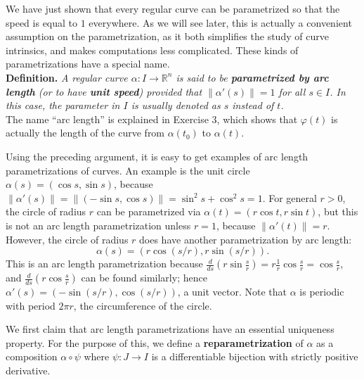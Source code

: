 \documentclass[leqno]{book}
\begin{document}
We have just shown that every regular curve can be parametrized so that the speed is equal to $1$ everywhere.  As we will see later, this is actually a convenient assumption on the parametrization, as it both simplifies the study of curve intrinsics, and makes computations less complicated.  These kinds of parametrizations have a special name.\\

\noindent\textbf{Definition.} \emph{A regular curve $\alpha:I\to\mathbb R^n$ is said to be \textbf{parametrized by arc length} (or to have \textbf{unit speed}) provided that $\|\alpha'(s)\|=1$ for all $s\in I$.  In this case, the parameter in $I$ is usually denoted as $s$ instead of $t$.}\\

\noindent The name ``arc length'' is explained in Exercise 3, which shows that $\varphi(t)$ is actually the length of the curve from $\alpha(t_0)$ to $\alpha(t)$.

Using the preceding argument, it is easy to get examples of arc length parametrizations of curves.  An example is the unit circle $\alpha(s)=(\cos s,\sin s)$, because $\|\alpha'(s)\|=\|(-\sin s,\cos s)\|=\sin^2s+\cos^2s=1$.  For general $r>0$, the circle of radius $r$ can be parametrized via $\alpha(t)=(r\cos t,r\sin t)$, but this is not an arc length parametrization unless $r=1$, because $\|\alpha'(t)\|=r$.  However, the circle of radius $r$ does have another parametrization by arc length:
$$\alpha(s)=(r\cos(s/r),r\sin(s/r)).$$
This is an arc length parametrization because $\frac d{ds}\left(r\sin\frac sr\right)=r\frac 1r\cos\frac sr=\cos\frac sr$, and $\frac d{ds}\left(r\cos\frac sr\right)$ can be found similarly; hence $\alpha'(s)=(-\sin(s/r),\cos(s/r))$, a unit vector.  Note that $\alpha$ is periodic with period $2\pi r$, the circumference of the circle.

We first claim that arc length parametrizations have an essential uniqueness property.  For the purpose of this, we define a \textbf{reparametrization} of $\alpha$ as a composition $\alpha\circ\psi$ where $\psi:J\to I$ is a differentiable bijection with strictly positive derivative.\\
\end{document}
